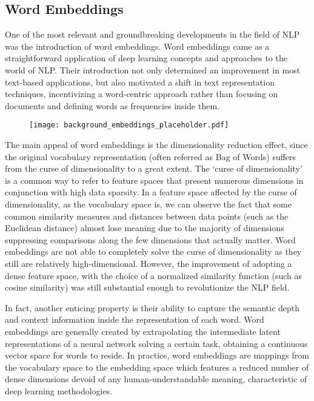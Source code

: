 \subsection{Word Embeddings}

One of the most relevant and groundbreaking developments in the field of NLP was the introduction of word embeddings.
Word embeddings came as a straightforward application of deep learning concepts and approaches to the world of NLP.
Their introduction not only determined an improvement in most text-based applications, but also motivated a shift in text representation techniques, incentivizing a word-centric approach rather than focusing on documents and defining words as frequencies inside them.

\begin{figure}[t!]
    \centering
    \texttt{[image: background\_embeddings\_placeholder.pdf]}
    \caption{}
    \label{fig:background_embeddings}
\end{figure}

The main appeal of word embeddings is the dimensionality reduction effect, since the original vocabulary representation (often referred as Bag of Words) suffers from the curse of dimensionality to a great extent.
The `curse of dimensionality' is a common way to refer to feature spaces that present numerous dimensions in conjunction with high data sparsity.
In a feature space affected by the curse of dimensionality, as the vocabulary space is, we can observe the fact that some common similarity measures and distances between data points (such as the Euclidean distance) almost lose meaning due to the majority of dimensions suppressing comparisons along the few dimensions that actually matter.
Word embeddings are not able to completely solve the curse of dimensionality as they still are relatively high-dimensional.
However, the improvement of adopting a dense feature space, with the choice of a normalized similarity function (such as cosine similarity) was still substantial enough to revolutionize the NLP field.

In fact, another enticing property is their ability to capture the semantic depth and context information inside the representation of each word.
Word embeddings are generally created by extrapolating the intermediate latent representations of a neural network solving a certain task, obtaining a continuous vector space for words to reside.
In practice, word embeddings are mappings from the vocabulary space to the embedding space which features a reduced number of dense dimensions devoid of any human-understandable meaning, characteristic of deep learning methodologies.

